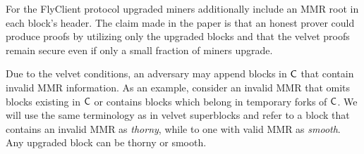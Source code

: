 %

	For the FlyClient protocol upgraded miners additionally include an MMR root in each block's header.
    The claim made in the paper is that an honest prover could produce proofs
    by utilizing only the upgraded blocks and that the velvet proofs remain secure even if only a small fraction of miners upgrade. 

    Due to the velvet conditions, an adversary may append blocks in $\mathsf{C}$ that contain invalid MMR information.
    As an example, consider an invalid MMR that omits blocks existing in $\mathsf{C}$ or contains blocks which belong in temporary forks of $\mathsf{C}$.
    We will use the same terminology as in velvet superblocks and refer to a block that contains an invalid MMR as \emph{thorny}, while to one with valid MMR as \emph{smooth}.
    Any upgraded block can be thorny or smooth.

